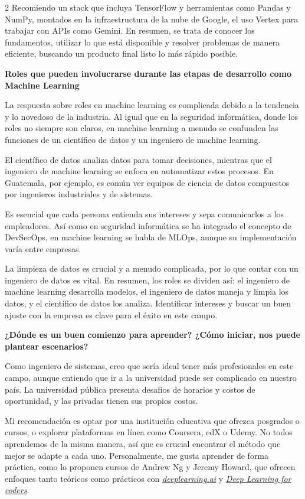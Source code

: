 \documentclass[12pt,spanish,Letterpaper,openany]{book}
\begin{document}
\begin {multicols}{2}
Recomiendo un stack que incluya TensorFlow y herramientas como Pandas y NumPy, montados en la infraestructura de la nube de Google, el uso Vertex para trabajar con APIs como Gemini. En resumen, se trata de conocer los fundamentos, utilizar lo que está disponible y resolver problemas de manera eficiente, buscando un producto final listo lo más rápido posible.

\textbf{Roles que pueden involucrarse durante las etapas de desarrollo como Machine Learning}

La respuesta sobre roles en machine learning es complicada debido a la tendencia y lo novedoso de la industria. Al igual que en la seguridad informática, donde los roles no siempre son claros, en machine learning a menudo se confunden las funciones de un científico de datos y un ingeniero de machine learning.

El científico de datos analiza datos para tomar decisiones, mientras que el ingeniero de machine learning se enfoca en automatizar estos procesos. En Guatemala, por ejemplo, es común ver equipos de ciencia de datos compuestos por ingenieros industriales y de sistemas.

Es esencial que cada persona entienda sus intereses y sepa comunicarlos a los empleadores. Así como en seguridad informática se ha integrado el concepto de DevSecOps, en machine learning se habla de MLOps, aunque su implementación varía entre empresas.

La limpieza de datos es crucial y a menudo complicada, por lo que contar con un ingeniero de datos es vital. En resumen, los roles se dividen así: el ingeniero de machine learning desarrolla modelos, el ingeniero de datos maneja y limpia los datos, y el científico de datos los analiza. Identificar intereses y buscar un buen ajuste con la empresa es clave para el éxito en este campo.

\textbf{¿Dónde es un buen comienzo para aprender? ¿Cómo iniciar, nos puede plantear escenarios?}

Como ingeniero de sistemas, creo que sería ideal tener más profesionales en este campo, aunque entiendo que ir a la universidad puede ser complicado en nuestro país. La universidad pública presenta desafíos de horarios y costos de oportunidad, y las privadas tienen sus propios costos.

Mi recomendación es optar por una institución educativa que ofrezca posgrados o cursos, o explorar plataformas en línea como Coursera, edX o Udemy. No todos aprendemos de la misma manera, así que es crucial encontrar el método que mejor se adapte a cada uno. Personalmente, me gusta aprender de forma práctica, como lo proponen cursos de Andrew Ng y Jeremy Howard, que ofrecen enfoques tanto teóricos como prácticos con \href{https://deeplearning.ai}{\emph{deeplearning.ai}} y \href{https://course.fast.ai/Resources/book.html}{\emph{Deep Learning for coders}}.


\end{multicols}
\end{document}
